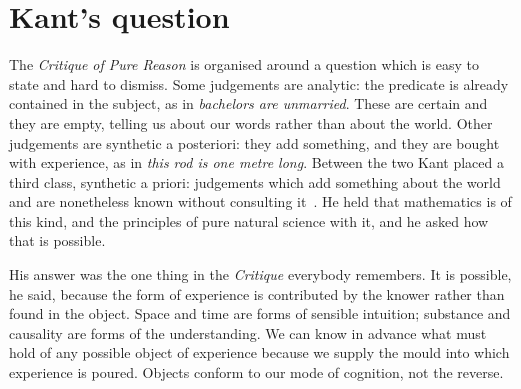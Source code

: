 \documentclass[11pt]{article}
\begin{document}
\begin{abstract}
That no fitted quantity appears anywhere in the three is moreover a requirement and not an accident
of tidy construction, and the requirement is Leibniz's. An arbitrary parameter is exactly a quantity
for which a theory can give no reason, so by the principle of sufficient reason it cannot stand:
either the theory determines it, and it was never arbitrary, or the theory is unfinished at that
point. A fitted parameter is not a measurement incorporated into a theory but a hole in the theory
with a number in it --- which is the charge against turbulence constants, against functionals
calibrated on a training set whose answers were known in advance, and against contracted basis sets.
The same principle disposes of the two concessions ordinarily made to Kant's critics. Three
dimensions is not an empirical input but forced, since below three nothing can be complicated and
above three nothing can be stable, which leaves one thinkable option; and a curvature adopted
without a reason for that curvature rather than another is an arbitrary parameter in geometrical
costume.
\end{abstract}

\section{Kant's question}\label{sec:question}

The \emph{Critique of Pure Reason} is organised around a question which is easy to state and hard to
dismiss. Some judgements are analytic: the predicate is already contained in the subject, as in
\emph{bachelors are unmarried}. These are certain and they are empty, telling us about our words
rather than about the world. Other judgements are synthetic a posteriori: they add something, and
they are bought with experience, as in \emph{this rod is one metre long}. Between the two Kant
placed a third class, synthetic a priori: judgements which add something about the world and are
nonetheless known without consulting it~\cite{kant,prolegomena}. He held that mathematics is of this kind, and the
principles of pure natural science with it, and he asked how that is possible.

His answer was the one thing in the \emph{Critique} everybody remembers. It is possible, he said,
because the form of experience is contributed by the knower rather than found in the object. Space
and time are forms of sensible intuition; substance and causality are forms of the understanding. We
can know in advance what must hold of any possible object of experience because we supply the mould
into which experience is poured. Objects conform to our mode of cognition, not the reverse.
\end{document}
